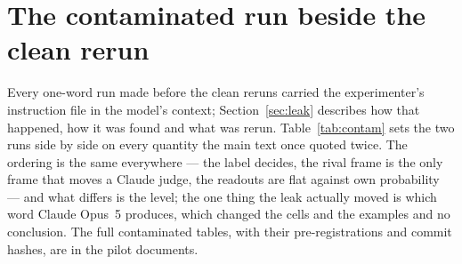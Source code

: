 \documentclass[twocolumn,10pt]{article}
\newcommand{\opus}{Claude Opus~5}
\begin{document}
\section{The contaminated run beside the clean rerun}
\label{app:contam}

Every one-word run made before the clean reruns carried the experimenter's instruction file in the model's context; Section~\ref{sec:leak} describes how that happened, how it was found and what was rerun. Table~\ref{tab:contam} sets the two runs side by side on every quantity the main text once quoted twice. The ordering is the same everywhere --- the label decides, the rival frame is the only frame that moves a Claude judge, the readouts are flat against own probability --- and what differs is the level; the one thing the leak actually moved is which word \opus{} produces, which changed the cells and the examples and no conclusion. The full contaminated tables, with their pre-registrations and commit hashes, are in the pilot documents.
\end{document}
